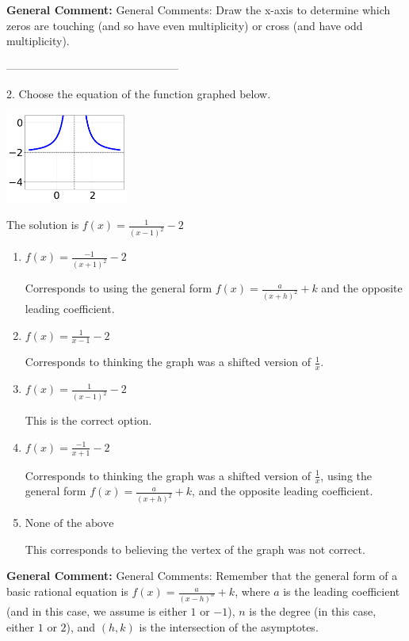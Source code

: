 \documentclass{extbook}[14pt]
\begin{document}
\textbf{General Comment:} General Comments: Draw the x-axis to determine which zeros are touching (and so have even multiplicity) or cross (and have odd multiplicity). 

-----------------------------------------------

2. Choose the equation of the function graphed below.
\begin{center} \includegraphics[width=0.3\textwidth]{../Figures/rationalGraphToEquationA.png} \end{center} 

The solution is $ f(x) = \frac{1}{(x - 1)^2} - 2 $ 

\begin{enumerate}[label=\Alph*.] 
\item $ f(x) = \frac{-1}{(x + 1)^2} - 2 $ 

 Corresponds to using the general form $f(x) = \frac{a}{(x+h)^2}+k$ and the opposite leading coefficient. 
\item $ f(x) = \frac{1}{x - 1} - 2 $ 

 Corresponds to thinking the graph was a shifted version of $\frac{1}{x}$. 
\item $ f(x) = \frac{1}{(x - 1)^2} - 2 $ 

 This is the correct option. 
\item $ f(x) = \frac{-1}{x + 1} - 2 $ 

 Corresponds to thinking the graph was a shifted version of $\frac{1}{x}$, using the general form $f(x) = \frac{a}{(x+h)^2}+k$, and the opposite leading coefficient. 
\item $ \text{None of the above} $ 

 This corresponds to believing the vertex of the graph was not correct. 
\end{enumerate} 
 
\textbf{General Comment:} General Comments: Remember that the general form of a basic rational equation is $ f(x) = \frac{a}{(x-h)^n} + k$, where $a$ is the leading coefficient (and in this case, we assume is either $1$ or $-1$), $n$ is the degree (in this case, either $1$ or $2$), and $(h, k)$ is the intersection of the asymptotes. 
\end{document}
